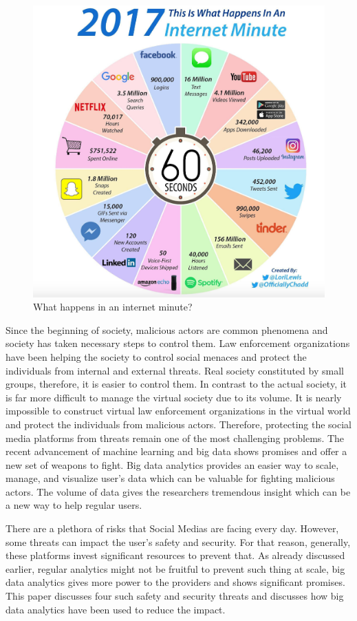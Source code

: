 \documentclass[sigconf]{acmart}
\begin{document}
\begin{figure}[!ht]
 \centering\includegraphics[width=0.5\columnwidth]{images/one-internet-minute.png}
  \caption{What happens in an internet minute?~\cite{social-media2}}\label{f:socialmedia}
\end{figure}

Since the beginning of society, malicious actors are common phenomena and society has taken necessary steps to control them. Law enforcement organizations have been helping the society to control social menaces and protect the individuals from internal and external threats.  Real society constituted by small groups, therefore, it is easier to control them. In contrast to the actual society, it is far more difficult to manage the virtual society due to its volume. It is nearly impossible to construct virtual law enforcement organizations in the virtual world and protect the individuals from malicious actors. Therefore, protecting the social media platforms from threats remain one of the most challenging problems. The recent advancement of machine learning and big data shows promises and offer a new set of weapons to fight. Big data analytics provides an easier way to scale, manage, and visualize user's data which can be valuable for fighting malicious actors. The volume of data gives the researchers tremendous insight which can be a new way to help regular users. 

There are a plethora of risks that Social Medias are facing every day. However, some threats can impact the user's safety and security. For that reason, generally, these platforms invest significant resources to prevent that. As already discussed earlier, regular analytics might not be fruitful to prevent such thing at scale, big data analytics gives more power to the providers and shows significant promises. This paper discusses four such safety and security threats and discusses how big data analytics have been used to reduce the impact. 
\end{document}
